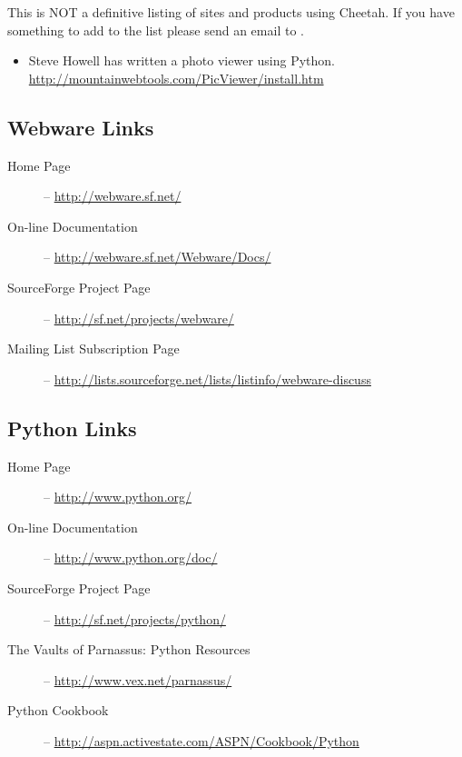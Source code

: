 This is NOT a definitive listing of sites and products using Cheetah. If you
have something to add to the list please send an email to
.

\begin{itemize}
\item Steve Howell has written a photo viewer using Python.
     \url{http://mountainwebtools.com/PicViewer/install.htm}
\end{itemize}


\subsection{Webware Links}
\label{links.webware}

\begin{description}
\item[Home Page] -- \url{http://webware.sf.net/}
     
\item[On-line Documentation] -- \url{http://webware.sf.net/Webware/Docs/}
     
\item[SourceForge Project Page] -- \url{http://sf.net/projects/webware/}
     
\item[Mailing List Subscription Page] --
     \url{http://lists.sourceforge.net/lists/listinfo/webware-discuss}

\end{description}

\subsection{Python Links}
\label{links.python}

\begin{description}
\item[Home Page] -- \url{http://www.python.org/}
\item[On-line Documentation] -- \url{http://www.python.org/doc/}
\item[SourceForge Project Page] -- \url{http://sf.net/projects/python/}
\item[The Vaults of Parnassus: Python Resources] --
     \url{http://www.vex.net/parnassus/}
\item[Python Cookbook] -- \url{http://aspn.activestate.com/ASPN/Cookbook/Python}
\end{description}

